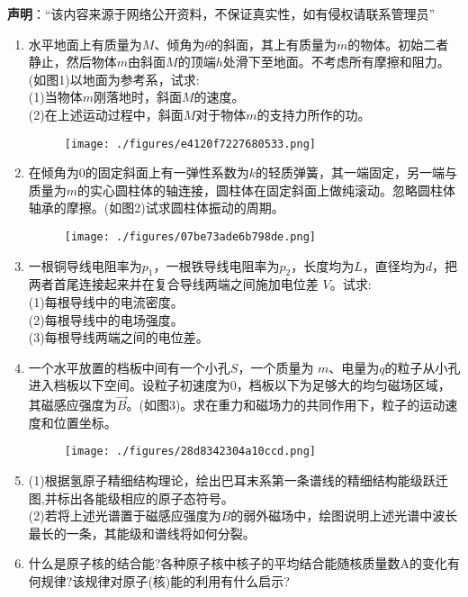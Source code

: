 
\textbf{声明}：“该内容来源于网络公开资料，不保证真实性，如有侵权请联系管理员”
\begin{enumerate}
\item 水平地面上有质量为$M$、倾角为$\theta$的斜面，其上有质量为$m$的物体。初始二者静止，然后物体$m$由斜面$M$的顶端$h$处滑下至地面。不考虑所有摩擦和阻力。(如图1)以地面为参考系，试求:\\
(1)当物体$m$刚落地时，斜面$M$的速度。\\
(2)在上述运动过程中，斜面$M$对于物体$m$的支持力所作的功。
\begin{figure}[ht]
\centering
\texttt{[image: ./figures/e4120f7227680533.png]}
\caption{} \label{fig_SSDPEE_1}
\end{figure}
\item 在倾角为0的固定斜面上有一弹性系数为$k$的轻质弹簧，其一端固定，另一端与质量为$m$的实心圆柱体的轴连接，圆柱体在固定斜面上做纯滚动。忽略圆柱体轴承的摩擦。(如图2)试求圆柱体振动的周期。
\begin{figure}[ht]
\centering
\texttt{[image: ./figures/07be73ade6b798de.png]}
\caption{} \label{fig_SSDPEE_2}
\end{figure}
\item 一根铜导线电阻率为$p_1$，一根铁导线电阻率为$p_2$，长度均为$L$，直径均为$d$，把两者首尾连接起来并在复合导线两端之间施加电位差 $V$。试求:\\
(1)每根导线中的电流密度。\\
(2)每根导线中的电场强度。\\
(3)每根导线两端之间的电位差。
\item 一个水平放置的档板中间有一个小孔$S$，一个质量为 $m$、电量为$q$的粒子从小孔进入档板以下空间。设粒子初速度为0，档板以下为足够大的均匀磁场区域，其磁感应强度为$\vec{B}$。(如图3)。求在重力和磁场力的共同作用下，粒子的运动速度和位置坐标。
\begin{figure}[ht]
\centering
\texttt{[image: ./figures/28d8342304a10ccd.png]}
\caption{} \label{fig_SSDPEE_3}
\end{figure}
\item (1)根据氢原子精细结构理论，绘出巴耳末系第一条谱线的精细结构能级跃迁图,并标出各能级相应的原子态符号。\\
(2)若将上述光谱置于磁感应强度为$B$的弱外磁场中，绘图说明上述光谱中波长最长的一条，其能级和谱线将如何分裂。
\item 什么是原子核的结合能?各种原子核中核子的平均结合能随核质量数A的变化有何规律?该规律对原子(核)能的利用有什么启示?
\end{enumerate}